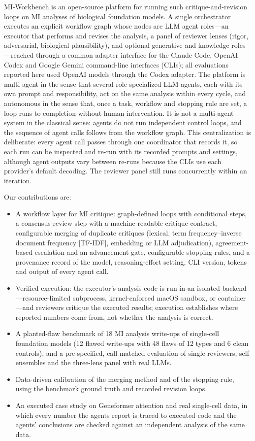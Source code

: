 \documentclass[10pt,letterpaper]{article}
\begin{document}
MI-Workbench is an open-source platform for running such critique-and-revision loops on MI analyses of biological foundation models. A single orchestrator executes an explicit workflow graph whose nodes are LLM agent roles---an executor that performs and revises the analysis, a panel of reviewer lenses (rigor, adversarial, biological plausibility), and optional generative and knowledge roles---reached through a common adapter interface for the Claude Code, OpenAI Codex and Google Gemini command-line interfaces (CLIs); all evaluations reported here used OpenAI models through the Codex adapter. The platform is multi-agent in the sense that several role-specialized LLM agents, each with its own prompt and responsibility, act on the same analysis within every cycle, and autonomous in the sense that, once a task, workflow and stopping rule are set, a loop runs to completion without human intervention. It is not a multi-agent system in the classical sense: agents do not run independent control loops, and the sequence of agent calls follows from the workflow graph. This centralization is deliberate: every agent call passes through one coordinator that records it, so each run can be inspected and re-run with its recorded prompts and settings, although agent outputs vary between re-runs because the CLIs use each provider's default decoding. The reviewer panel still runs concurrently within an iteration.

Our contributions are:
\begin{itemize}
  \item A workflow layer for MI critique: graph-defined loops with conditional steps, a consensus-review step with a machine-readable critique contract, configurable merging of duplicate critiques (lexical, term frequency--inverse document frequency [TF-IDF], embedding or LLM adjudication), agreement-based escalation and an advancement gate, configurable stopping rules, and a provenance record of the model, reasoning-effort setting, CLI version, tokens and output of every agent call.
  \item Verified execution: the executor's analysis code is run in an isolated backend---resource-limited subprocess, kernel-enforced macOS sandbox, or container---and reviewers critique the executed results; execution establishes where reported numbers come from, not whether the analysis is correct.
  \item A planted-flaw benchmark of 18 MI analysis write-ups of single-cell foundation models (12 flawed write-ups with 48 flaws of 12 types and 6 clean controls), and a pre-specified, call-matched evaluation of single reviewers, self-ensembles and the three-lens panel with real LLMs.
  \item Data-driven calibration of the merging method and of the stopping rule, using the benchmark ground truth and recorded revision loops.
  \item An executed case study on Geneformer attention and real single-cell data, in which every number the agents report is traced to executed code and the agents' conclusions are checked against an independent analysis of the same data.
\end{itemize}
\end{document}
